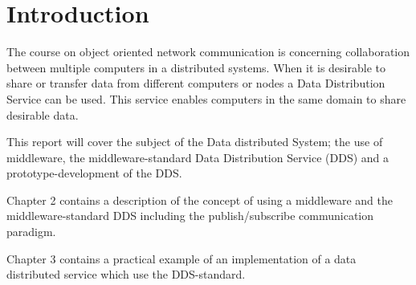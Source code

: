 \documentclass[Main]{subfiles}
\begin{document}
\chapter{Introduction}
The course on object oriented network communication is concerning collaboration between multiple computers in a distributed systems. When it is desirable to share or transfer data from different computers or nodes a Data Distribution Service can be used. This service enables computers in the same domain to share desirable data. \vspace{10pt}

This report will cover the subject of the Data distributed System; the use of middleware, the middleware-standard Data Distribution Service (DDS) and a prototype-development of the DDS.\vspace{10pt}

Chapter 2 contains a description of the concept of using a middleware and the middleware-standard DDS including the publish/subscribe communication paradigm.\vspace{10pt}

Chapter 3 contains a practical example of an implementation of a data distributed service which use the DDS-standard.
\end{document}
